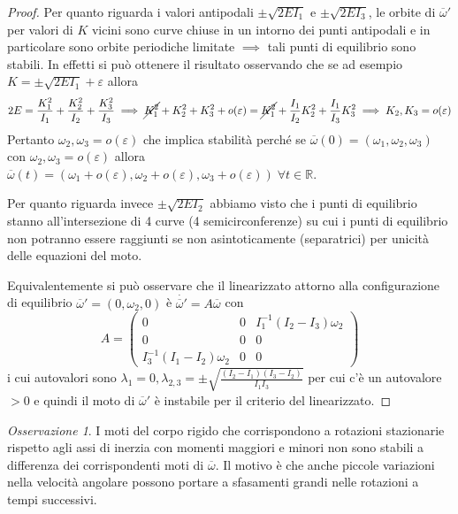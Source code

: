 \documentclass{book}
\theoremstyle{plain}
\theoremstyle{plain}
\theoremstyle{plain}
\theoremstyle{plain}
\theoremstyle{plain}
\theoremstyle{definition}
\theoremstyle{remark}
\newtheorem*{oss}{Osservazione}
\theoremstyle{definition}
\begin{document}
\begin{proof}
    Per quanto riguarda i valori antipodali $\pm\sqrt{2EI_1}$ e $\pm\sqrt{2EI_3}$, le orbite di $\overline{\omega}'$ per valori di $K$ vicini sono curve chiuse in un intorno dei punti antipodali e in particolare sono orbite periodiche limitate $\implies$ tali punti di equilibrio sono stabili. In effetti si può ottenere il risultato osservando che se ad esempio $K=\pm\sqrt{2EI_1}+\varepsilon$ allora
    \begin{displaymath}
        2E=\frac{K_1^2}{I_1}+\frac{K_2^2}{I_2}+\frac{K_3^2}{I_3}\implies\cancel{K_1^2}+K_2^2+K_3^2+o(\varepsilon)=\cancel{K_1^2}+\frac{I_1}{I_2}K_2^2+\frac{I_1}{I_3}K_3^2\implies K_2, K_3=o(\varepsilon)
    \end{displaymath}
    Pertanto $\omega_2,\omega_3=o(\varepsilon)$ che implica stabilità perché se $\overline{\omega}(0)=(\omega_1,\omega_2,\omega_3)$ con $\omega_2,\omega_3=o(\varepsilon)$ allora $\overline{\omega}(t)=\left(\omega_1+o(\varepsilon),\omega_2+o(\varepsilon),\omega_3+o(\varepsilon)\right) \;\forall t\in\mathbb{R}$.

    \noindent Per quanto riguarda invece $\pm\sqrt{2EI_2}$ abbiamo visto che i punti di equilibrio stanno all'intersezione di 4 curve (4 semicirconferenze) su cui i punti di equilibrio non potranno essere raggiunti se non asintoticamente (separatrici) per unicità delle equazioni del moto.

    \noindent Equivalentemente si può osservare che il linearizzato attorno alla configurazione di equilibrio $\overline{\omega}'=(0, \omega_2, 0)$ è $\Dot{\overline{\omega}'}=A\overline{\omega}$ con
    \begin{displaymath}
        A=\begin{pmatrix}
            0 & 0 & I_1^{-1}(I_2-I_3)\omega_2 \\
            0 & 0 & 0 \\
            I_3^{-1}(I_1-I_2)\omega_2 & 0 & 0
        \end{pmatrix}
    \end{displaymath}
    i cui autovalori sono $\lambda_1=0, \lambda_{2,3}=\pm\sqrt{\frac{(I_2-I_1)(I_3-I_2)}{I_1I_3}}$ per cui c'è un autovalore $>0$ e quindi il moto di $\overline{\omega}'$ è instabile per il criterio del linearizzato.
\end{proof}

\begin{oss}
    I moti del corpo rigido che corrispondono a rotazioni stazionarie rispetto agli assi di inerzia con momenti maggiori e minori non sono stabili a differenza dei corrispondenti moti di $\overline{\omega}$. Il motivo è che anche piccole variazioni nella velocità angolare possono portare a sfasamenti grandi nelle rotazioni a tempi successivi.
\end{oss}
\end{document}
